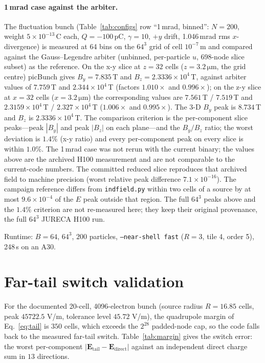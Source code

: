 \paragraph{1\,mrad case against the arbiter.}
The fluctuation bunch (Table~\ref{tab:configs} row ``1\,mrad, binned'':
$N=200$, weight $5\times10^{-13}$\,C each, $Q=-100$\,pC, $\gamma=10$,
$+y$ drift, 1.046\,mrad rms $x$-divergence) is measured at 64 bins on the
$64^3$ grid of cell $10^{-7}$\,m and compared against the Gauss--Legendre
arbiter (unbinned, per-particle $u$, 698-node slice subset) as the
reference. On the x-y slice at $z=32$ cells ($z=3.2\,\si{\micro\metre}$,
the grid centre) picBunch gives
$B_y=7.835$\,T and $B_z=2.3336\times10^{4}$\,T, against arbiter values of
$7.759$\,T and $2.344\times10^{4}$\,T (factors $1.010\times$ and
$0.996\times$); on the z-y slice at $x=32$ cells ($x=3.2\,\si{\micro\metre}$)
the corresponding values are
$7.561$\,T / $7.519$\,T and $2.3159\times10^{4}$\,T /
$2.327\times10^{4}$\,T ($1.006\times$ and $0.995\times$). The 3-D $B_y$
peak is $8.734$\,T and $B_z$ is $2.3336\times10^{4}$\,T. The comparison
criterion is the per-component slice peaks---peak $|B_y|$ and peak $|B_z|$
on each plane---and the $B_y/B_z$ ratio; the worst deviation is $1.4\%$
(x-y ratio) and every per-component peak on every slice is within $1.0\%$.
The 1\,mrad case was not rerun with the current binary; the values above are
the archived H100 measurement and are not comparable to the current-code
numbers. The committed reduced slice reproduces that archived field to
machine precision (worst relative peak difference $7.1\times10^{-16}$). The campaign
reference differs from \texttt{indfield.py} within two cells of a source by
at most $9.6\times10^{-4}$ of the $E$ peak outside that region. The full
$64^3$ peaks above and the $1.4\%$ criterion are not re-measured here; they
keep their original provenance, the full $64^3$ JURECA H100 run.

Runtime: $B=64$, $64^3$, $200$ particles, \texttt{--near-shell fast}
($R=3$, tile 4, order 5), 248\,s on an A30.

\section*{Far-tail switch validation}
\label{app:far-tail}

For the documented 20-cell, 4096-electron bunch (source radius $R=16.85$
cells, peak $45722.5$ V/m, tolerance level $45.72$ V/m), the quadrupole
margin of Eq.~\eqref{eq:tail} is $350$ cells, which exceeds the
$2^{28}$ padded-node cap, so the code falls back to the measured far-tail
switch. Table~\ref{tab:margin} gives the switch error: the worst
per-component $|\mathbf{E}_{\mathrm{tail}}-\mathbf{E}_{\mathrm{direct}}|$
against an independent direct charge sum in $13$ directions.

